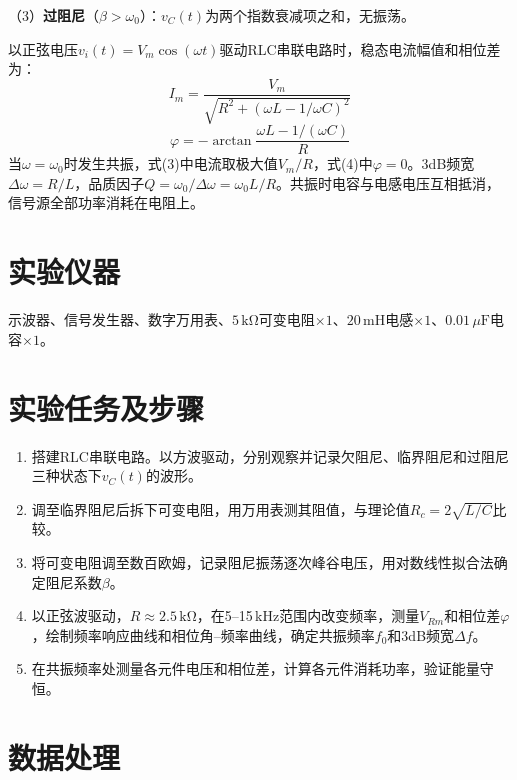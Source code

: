 \documentclass[12pt, a4paper]{article}
\begin{document}
（3）\textbf{过阻尼}（$\beta > \omega_0$）：$v_C(t)$为两个指数衰减项之和，无振荡。

\vspace{0.3cm}
以正弦电压$v_i(t) = V_m\cos(\omega t)$驱动RLC串联电路时，稳态电流幅值和相位差为：
\begin{equation}
    I_m = \frac{V_m}{\sqrt{R^2 + (\omega L - 1/\omega C)^2}}
\end{equation}
\begin{equation}
    \varphi = -\arctan\frac{\omega L - 1/(\omega C)}{R}
\end{equation}
当$\omega = \omega_0$时发生共振，式(3)中电流取极大值$V_m / R$，式(4)中$\varphi = 0$。3dB频宽$\Delta\omega = R/L$，品质因子$Q = \omega_0 / \Delta\omega = \omega_0 L / R$。共振时电容与电感电压互相抵消，信号源全部功率消耗在电阻上。

\section*{实验仪器}

示波器、信号发生器、数字万用表、$5\,\mathrm{k\Omega}$可变电阻$\times 1$、$20\,\mathrm{mH}$电感$\times 1$、$0.01\,\mu\mathrm{F}$电容$\times 1$。

\section*{实验任务及步骤}

\begin{enumerate}[label=\arabic*.]
    \item 搭建RLC串联电路。以方波驱动，分别观察并记录欠阻尼、临界阻尼和过阻尼三种状态下$v_C(t)$的波形。
    \item 调至临界阻尼后拆下可变电阻，用万用表测其阻值，与理论值$R_c = 2\sqrt{L/C}$比较。
    \item 将可变电阻调至数百欧姆，记录阻尼振荡逐次峰谷电压，用对数线性拟合法确定阻尼系数$\beta$。
    \item 以正弦波驱动，$R \approx 2.5\,\mathrm{k\Omega}$，在5--15\,kHz范围内改变频率，测量$V_{Rm}$和相位差$\varphi$，绘制频率响应曲线和相位角--频率曲线，确定共振频率$f_0$和3dB频宽$\Delta f$。
    \item 在共振频率处测量各元件电压和相位差，计算各元件消耗功率，验证能量守恒。
\end{enumerate}

\section*{数据处理}
\end{document}
